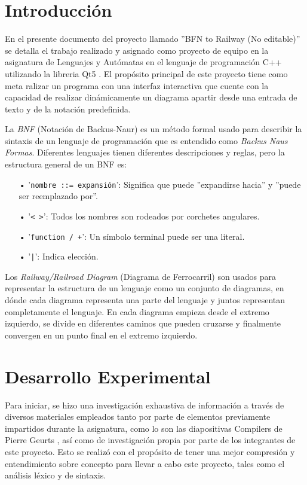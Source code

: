 \documentclass[conference]{IEEEtran}
\begin{document}
\section{Introducción}
En el presente documento del proyecto llamado ''BFN to Railway (No editable)'' se detalla el trabajo realizado y asignado como proyecto de equipo en la asignatura de Lenguajes y Autómatas en el lenguaje de programación C++ \cite{book-data_structures}  utilizando la libreria Qt5 \cite{qt}. El propósito principal de este proyecto tiene como meta ralizar un programa con una interfaz interactiva que cuente con la capacidad de realizar dinámicamente un diagrama apartir desde una entrada de texto y de la notación predefinida.

La \textit{BNF} (Notación de Backus-Naur) \cite{bnf} es un método formal 
usado para describir la sintaxis de un lenguaje de programación que es entendido como \textit{Backus Naus Formas}. Diferentes lenguajes tienen diferentes descripciones y reglas, pero la estructura general de un BNF es:
\begin{itemize} 
    \item [•] '{\footnotesize\texttt{nombre ::= expansión}}': Significa que puede ''expandirse hacia'' y ''puede ser reemplazado por''.
    \item [•] '{\footnotesize\texttt{< >}}': Todos los nombres son rodeados por corchetes angulares.
    \item [•] '{\footnotesize\texttt{function / +}}': Un símbolo terminal puede ser una literal.
    \item [•] '{\footnotesize\texttt{|}}': Indica elección.
\end{itemize}

Los \textit{Railway/Railroad Diagram} (Diagrama de Ferrocarril) \cite{sintax_diagram} son usados para representar la estructura de un lenguaje como un conjunto de diagramas, en dónde cada diagrama representa una parte del lenguaje y juntos representan completamente el lenguaje. En cada diagrama empieza desde el extremo izquierdo, se divide en diferentes caminos que pueden cruzarse y finalmente convergen en un punto final en el extremo izquierdo.


\section{Desarrollo Experimental}
Para iniciar, se hizo una investigación exhaustiva de información a través de diversos materiales empleados tanto por parte de elementos previamente impartidos durante la asignatura, como lo son las diapositivas Compilers de Pierre Geurts \cite{compilers}, así como de investigación propia por parte de los integrantes de este proyecto. Esto se realizó con el propósito de tener una mejor compresión y entendimiento sobre concepto para llevar a cabo este proyecto, tales como el análisis léxico\cite{lexico} y de sintaxis\cite{sintaxis}. 
\end{document}
